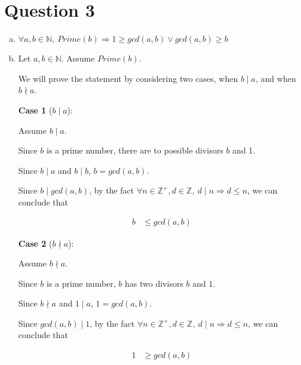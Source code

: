 \documentclass[12pt]{article}
\begin{document}
\section*{Question 3}
\begin{enumerate}[a.]
    \item

    $\forall a,b \in \mathbb{N},\:Prime(b) \Rightarrow 1 \geq gcd(a,b) \lor
    gcd(a,b) \geq b$

    \item

    Let $a,b \in \mathbb{N}$. Assume $Prime(b)$.

    \bigskip

    We will prove the statement by considering two cases, when $b \mid a$, and
    when $b \nmid a$.

    \bigskip

    \textbf{Case 1} ($b \mid a$):

    \bigskip

    Assume $b \mid a$.

    \bigskip

    Since $b$ is a prime number, there are to possible divisors $b$ and 1.

    \bigskip

    Since $b \mid a$ and $b \mid b$, $b = gcd(a,b)$.

    \bigskip

    Since $b \mid gcd(a,b)$, by the fact $\forall n \in \mathbb{Z}^{+},
    d \in \mathbb{Z},\: d \mid n \Rightarrow d \leq n$, we can conclude that

    \setcounter{equation}{0}
    \begin{align}
        b &\leq gcd(a,b)
    \end{align}

    \textbf{Case 2} ($b \nmid a$):

    \bigskip

    Assume $b \nmid a$.

    \bigskip

    Since $b$ is a prime number, $b$ has two divisors $b$ and $1$.

    \bigskip

    Since $b \nmid a$ and $1 \mid a$, $1 = gcd(a,b)$.

    \bigskip

    Since $gcd(a,b) \mid 1$, by the fact $\forall n \in \mathbb{Z}^{+},
    d \in \mathbb{Z},\: d \mid n \Rightarrow d \leq n$, we can conclude that

    \setcounter{equation}{0}
    \begin{align}
        1 &\geq gcd(a,b)
    \end{align}


\end{enumerate}
\end{document}
